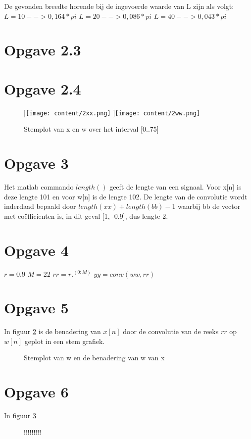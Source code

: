 \documentclass{article}
\begin{document}
De gevonden breedte horende bij de ingevoerde waarde van L zijn als volgt:
$L=10 --> 0,164*pi$
$L=20 --> 0,086*pi$
$L=40 --> 0,043*pi $


\section{Opgave 2.3}
\section{Opgave 2.4}
\begin{figure}[h]
  \centering
 	\subfloat[][x[n]]{\texttt{[image: content/2xx.png]}}
	\subfloat[][w[n]]{\texttt{[image: content/2ww.png]}}
  \caption{Stemplot van x en w over het interval [0..75]}
  \label{fig:opgave2}
\end{figure}

\section{Opgave 3}
Het matlab commando $length()$ geeft de lengte van een signaal. Voor x[n] is deze lengte 101 en voor w[n] is de lengte 102. De lengte van de convolutie wordt inderdaad bepaald door $length(xx)+length(bb)-1$ waarbij bb de vector met co\"efficienten is, in dit geval [1, -0.9], dus lengte 2.

\section{Opgave 4}
$r = 0.9$
$M = 22$
$rr = r .^ (0:M)$
$yy = conv(ww, rr)$

\section{Opgave 5}
In figuur \ref{fig:opgave5} is de benadering van $x[n]$ door de convolutie van de reeks $rr$ op $w[n]$ geplot in een stem grafiek.
\begin{figure}[h]
  \centering
  \caption{Stemplot van w en de benadering van w van x}
  \label{fig:opgave5}
\end{figure}
\section{Opgave 6}
In figuur \ref{fig:opgave6}
\begin{figure}[h]
  \centering
  \caption{!!!!!!!!!}
  \label{fig:opgave6}
\end{figure}
\end{document}
